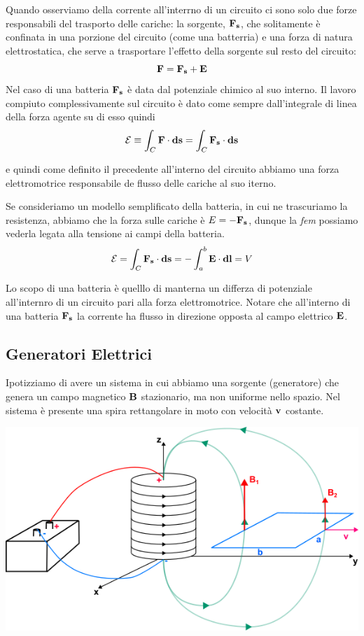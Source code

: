 Quando osserviamo della corrente all'interrno di un circuito ci sono solo  due forze responsabili del trasporto delle cariche: la sorgente, $\bold{F_s}$, che solitamente  \`e confinata in una porzione del circuito (come una batterria) e una forza di natura elettrostatica, che serve a trasportare l'effetto della sorgente sul  resto del circuito:
\begin{equation}
	\bold{F} = \bold{F_s}  + \bold{E}
\end{equation}
Nel caso di una batteria $\bold{F_s}$ \`e data dal potenziale chimico al suo interno. Il lavoro compiuto complessivamente sul circuito \`e dato come sempre dall'integrale di linea della forza agente su di esso quindi 
\begin{equation*}
	\mathcal{E} \equiv \int_{C} \bold{F} \cdot \bold{ds} = \int_C  \bold{F_s}  \cdot \bold{ds}
\end{equation*}

e quindi come definito il precedente all'interno del circuito  abbiamo una forza elettromotrice responsabile de flusso delle cariche al suo iterno.  

Se consideriamo un modello semplificato della batteria, in cui ne trascuriamo la resistenza,  abbiamo che la forza sulle cariche \`e  $E = -\bold{F_s} $, dunque la \textit{fem} possiamo vederla legata alla tensione ai campi della batteria.
\begin{equation*}
	\mathcal{E} = \int_{C} \bold{F_s} \cdot \bold{ds} = - \int_{a}^b \bold{E} \cdot \bold{dl} = V
\end{equation*}

Lo scopo di una batteria \`e  quelllo di manterna un differza di potenziale all'internro di un circuito pari alla forza elettromotrice. Notare che all'interno di una batteria $\bold{F_s}$ la corrente ha flusso in direzione opposta al campo elettrico $\bold{E}$.
 \newpage

\subsection{Generatori Elettrici}

Ipotizziamo di avere un sistema in cui abbiamo una sorgente (generatore) che genera un campo magnetico $\bold{B}$ stazionario, ma non uniforme nello spazio. Nel sistema \`e presente una spira rettangolare in moto con velocit\`a $\bold{v}$ costante.

\begin{center}
	\includegraphics[width = 0.6 \textwidth]{images/generator.png}
\end{center}

